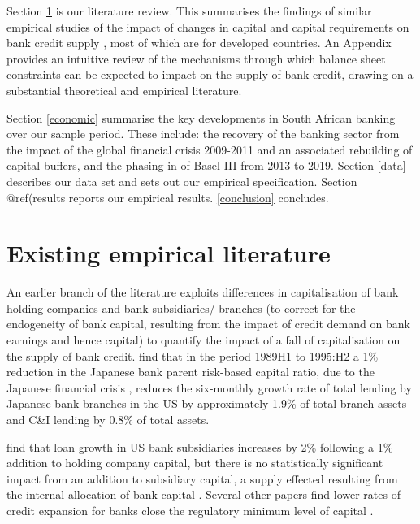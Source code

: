 \documentclass[
  12,
]{article}
\begin{document}
Section \ref{literature} is our literature review. This summarises the findings of similar empirical studies of the impact of changes in capital and capital requirements on bank credit supply , most of which are for developed countries. An Appendix provides an intuitive review of the mechanisms through which balance sheet constraints can be expected to impact on the supply of bank credit, drawing on a substantial theoretical and empirical literature.

Section \ref{economic} summarise the key developments in South African banking over our sample period. These include: the recovery of the banking sector from the impact of the global financial crisis 2009-2011 and an associated rebuilding of capital buffers, and the phasing in of Basel III from 2013 to 2019. Section \ref{data} describes our data set and sets out our empirical specification. Section @ref(results reports our empirical results. \ref{conclusion} concludes.

\hypertarget{literature}{%
\section{Existing empirical literature}\label{literature}}

An earlier branch of the literature exploits differences in capitalisation of bank holding companies and bank subsidiaries/ branches (to correct for the endogeneity of bank capital, resulting from the impact of credit demand on bank earnings and hence capital) to quantify the impact of a fall of capitalisation on the supply of bank credit. \citet{peek1997international} find that in the period 1989H1 to 1995:H2 a 1\% reduction in the Japanese bank parent risk-based capital ratio, due to the Japanese financial crisis , reduces the six-monthly growth rate of total lending by Japanese bank branches in the US by approximately 1.9\% of total branch assets and C\&I lending by 0.8\% of total assets.

\citet{houston1997capital} find that loan growth in US bank subsidiaries increases by 2\% following a 1\% addition to holding company capital, but there is no statistically significant impact from an addition to subsidiary capital, a supply effected resulting from the internal allocation of bank capital \citep[ on losses in the 1930s]{calomiris2003fundamentals, calomiris1998bank}. Several other papers find lower rates of credit expansion for banks close the regulatory minimum level of capital \citep[see,][]{hancock1994bank, berger1994lines, nier2005bank, van2008welfare, gambacorta2004does, berrospide2010effects}.
\end{document}
